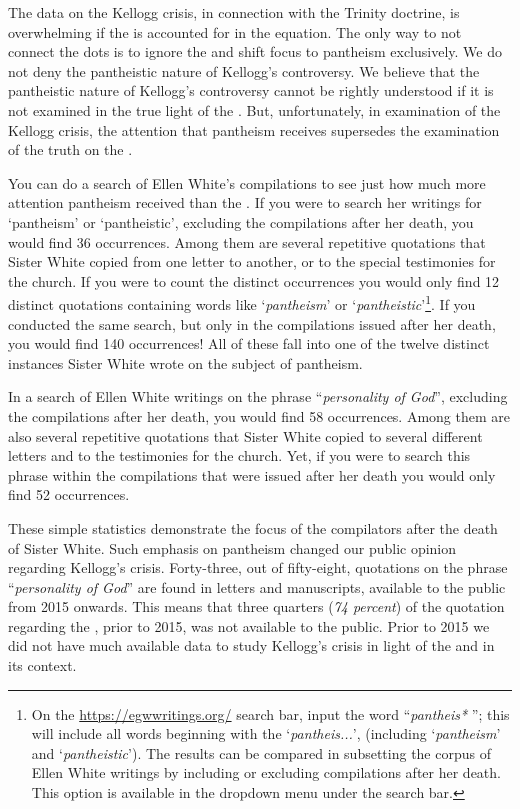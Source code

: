 The data on the Kellogg crisis, in connection with the Trinity doctrine, is overwhelming if the  is accounted for in the equation. The only way to not connect the dots is to ignore the  and shift focus to pantheism exclusively. We do not deny the pantheistic nature of Kellogg's controversy. We believe that the pantheistic nature of Kellogg's controversy cannot be rightly understood if it is not examined in the true light of the . But, unfortunately, in examination of the Kellogg crisis, the attention that pantheism receives supersedes the examination of the truth on the .

You can do a search of Ellen White’s compilations to see just how much more attention pantheism received than the . If you were to search her writings for ‘pantheism’ or ‘pantheistic’, excluding the compilations after her death, you would find 36 occurrences. Among them are several repetitive quotations that Sister White copied from one letter to another, or to the special testimonies for the church. If you were to count the distinct occurrences you would only find 12 distinct quotations containing words like ‘\textit{pantheism}’ or ‘\textit{pantheistic}’\footnote{On the \href{https://egwwritings.org/}{https://egwwritings.org/} search bar, input the word “\textit{pantheis*} ”; this will include all words beginning with the ‘\textit{pantheis...}’, (including ‘\textit{pantheism}’ and ‘\textit{pantheistic}’). The results can be compared in subsetting the corpus of Ellen White writings by including or excluding compilations after her death. This option is available in the dropdown menu under the search bar.}. If you conducted the same search, but only in the compilations issued after her death, you would find 140 occurrences! All of these fall into one of the twelve distinct instances Sister White wrote on the subject of pantheism.

In a search of Ellen White writings on the phrase “\textit{personality of God}”, excluding the compilations after her death, you would find 58 occurrences. Among them are also several repetitive quotations that Sister White copied to several different letters and to the testimonies for the church. Yet, if you were to search this phrase within the compilations that were issued after her death you would only find 52 occurrences.

These simple statistics demonstrate the focus of the compilators after the death of Sister White. Such emphasis on pantheism changed our public opinion regarding Kellogg’s crisis. Forty-three, out of fifty-eight, quotations on the phrase “\textit{personality of God}” are found in letters and manuscripts, available to the public from 2015 onwards. This means that three quarters (\textit{74 percent}) of the quotation regarding the , prior to 2015, was not available to the public. Prior to 2015 we did not have much available data to study Kellogg's crisis in light of the  and in its context.

